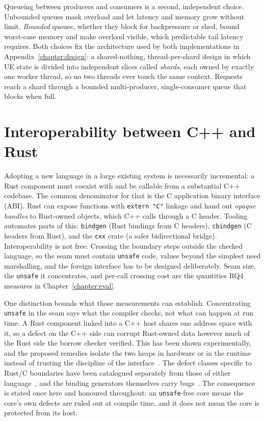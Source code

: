 \documentclass[english,oneside,a4paper,censored,csm,software-track-2020]{HYthesisML}
\begin{document}
\begin{appendices}
Queueing between producers and consumers is a second, independent choice. Unbounded queues mask
overload and let latency and memory grow without limit. \emph{Bounded} queues, whether they block
for backpressure or shed, bound worst-case memory and make overload visible, which predictable
tail latency requires. Both choices fix the architecture used by both implementations in
Appendix~\ref{chapter:design}: a shared-nothing, thread-per-shard design in which UE state is
divided into independent slices
called \emph{shards}, each owned by exactly one worker thread, so no two threads ever touch the
same context. Requests reach a shard through a bounded multi-producer, single-consumer queue that
blocks when full.

\section{Interoperability between C++ and Rust}\label{sec:interop}
Adopting a new language in a large existing system is necessarily incremental: a Rust component
must coexist with and be callable from a substantial C++ codebase. The common denominator for
that is the C application binary interface (ABI). Rust can expose functions with
\texttt{extern "C"} linkage and hand out \emph{opaque handles} to Rust-owned objects, which C++
calls through a C header. Tooling automates parts of this: \texttt{bindgen} (Rust bindings from
C headers), \texttt{cbindgen} (C headers from Rust), and the \texttt{cxx} crate (a safer
bidirectional bridge). Interoperability is not free. Crossing the boundary steps outside the
checked language, so the seam must contain \texttt{unsafe} code, values beyond the simplest need
marshalling, and the foreign interface has to be designed deliberately. Seam size, the
\texttt{unsafe} it concentrates, and per-call crossing cost are the quantities RQ4 measures in
Chapter~\ref{chapter:eval}.

One distinction bounds what those measurements can establish. Concentrating \texttt{unsafe} in
the seam says what the compiler checks, not what can happen at run time. A Rust component linked
into a C++ host shares one address space with it, so a defect on the C++ side can corrupt
Rust-owned data however much of the Rust side the borrow checker verified. This has been shown
experimentally, and the proposed remedies isolate the two heaps in hardware or in the runtime
instead of trusting the discipline of the
interface~\cite{rivera2021galeed,kirth2022pkrusafe}. The defect classes specific to Rust/C
boundaries have been catalogued separately from those of either
language~\cite{li2022crosslang}, and the binding generators themselves carry
bugs~\cite{cai2026interop}. The consequence is stated once here and honoured throughout: an
\texttt{unsafe}-free core means the core's own defects are ruled out at compile time, and it
does not mean the core is protected from its host.


\end{appendices}
\end{document}
